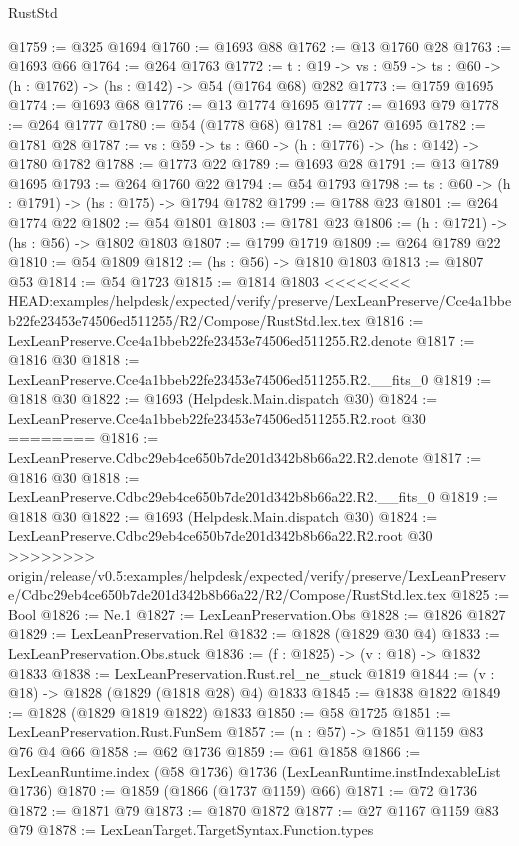 \begin{lexlean}{RustStd}
\begin{coremodule}
{\begin{coremodule}
{{{{{@1759 := @325 @1694
@1760 := @1693 @88
@1762 := @13 @1760 @28
@1763 := @1693 @66
@1764 := @264 @1763
@1772 := {t : @19} -> {vs : @59} -> {ts : @60} -> (h : @1762) -> (hs : @142) -> @54 (@1764 @68) @282
@1773 := @1759 @1695
@1774 := @1693 @68
@1776 := @13 @1774 @1695
@1777 := @1693 @79
@1778 := @264 @1777
@1780 := @54 (@1778 @68)
@1781 := @267 @1695
@1782 := @1781 @28
@1787 := {vs : @59} -> {ts : @60} -> (h : @1776) -> (hs : @142) -> @1780 @1782
@1788 := @1773 @22
@1789 := @1693 @28
@1791 := @13 @1789 @1695
@1793 := @264 @1760 @22
@1794 := @54 @1793
@1798 := {ts : @60} -> (h : @1791) -> (hs : @175) -> @1794 @1782
@1799 := @1788 @23
@1801 := @264 @1774 @22
@1802 := @54 @1801
@1803 := @1781 @23
@1806 := (h : @1721) -> (hs : @56) -> @1802 @1803
@1807 := @1799 @1719
@1809 := @264 @1789 @22
@1810 := @54 @1809
@1812 := (hs : @56) -> @1810 @1803
@1813 := @1807 @53
@1814 := @54 @1723
@1815 := @1814 @1803
<<<<<<<< HEAD:examples/helpdesk/expected/verify/preserve/LexLeanPreserve/Cce4a1bbeb22fe23453e74506ed511255/R2/Compose/RustStd.lex.tex
@1816 := LexLeanPreserve.Cce4a1bbeb22fe23453e74506ed511255.R2.denote
@1817 := @1816 @30
@1818 := LexLeanPreserve.Cce4a1bbeb22fe23453e74506ed511255.R2.__fits_0
@1819 := @1818 @30
@1822 := @1693 (Helpdesk.Main.dispatch @30)
@1824 := LexLeanPreserve.Cce4a1bbeb22fe23453e74506ed511255.R2.root @30
========
@1816 := LexLeanPreserve.Cdbc29eb4ce650b7de201d342b8b66a22.R2.denote
@1817 := @1816 @30
@1818 := LexLeanPreserve.Cdbc29eb4ce650b7de201d342b8b66a22.R2.__fits_0
@1819 := @1818 @30
@1822 := @1693 (Helpdesk.Main.dispatch @30)
@1824 := LexLeanPreserve.Cdbc29eb4ce650b7de201d342b8b66a22.R2.root @30
>>>>>>>> origin/release/v0.5:examples/helpdesk/expected/verify/preserve/LexLeanPreserve/Cdbc29eb4ce650b7de201d342b8b66a22/R2/Compose/RustStd.lex.tex
@1825 := Bool
@1826 := Ne.{1}
@1827 := LexLeanPreservation.Obs
@1828 := @1826 @1827
@1829 := LexLeanPreservation.Rel
@1832 := @1828 (@1829 @30 @4)
@1833 := LexLeanPreservation.Obs.stuck
@1836 := (f : @1825) -> (v : @18) -> @1832 @1833
@1838 := LexLeanPreservation.Rust.rel_ne_stuck @1819
@1844 := (v : @18) -> @1828 (@1829 (@1818 @28) @4) @1833
@1845 := @1838 @1822
@1849 := @1828 (@1829 @1819 @1822) @1833
@1850 := @58 @1725
@1851 := LexLeanPreservation.Rust.FunSem
@1857 := (n : @57) -> @1851 @1159 @83 @76 @4 @66
@1858 := @62 @1736
@1859 := @61 @1858
@1866 := LexLeanRuntime.index (@58 @1736) @1736 (LexLeanRuntime.instIndexableList @1736)
@1870 := @1859 (@1866 (@1737 @1159) @66)
@1871 := @72 @1736
@1872 := @1871 @79
@1873 := @1870 @1872
@1877 := @27 @1167 @1159 @83 @79
@1878 := LexLeanTarget.TargetSyntax.Function.types
}}}}}
\end{coremodule}}
\end{coremodule}
\end{lexlean}
